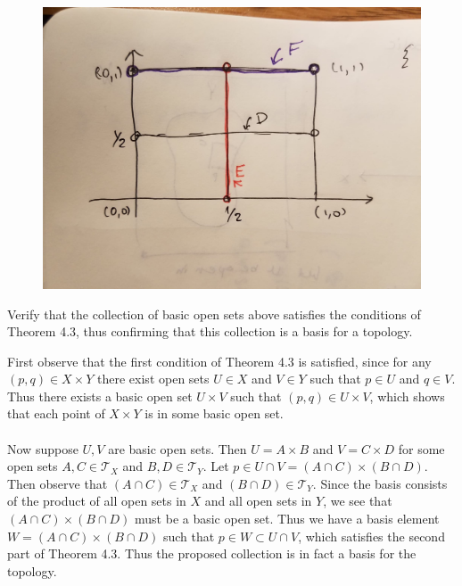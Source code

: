 \documentclass[a4paper,12pt,twoside]{hmcpset}
\begin{document}
\begin{figure}[h!]
    \includegraphics[width = \textwidth]{figures_theorems_sect_4/exercise_4_31.jpg}
\end{figure}

\begin{exercise}[Exercise 4.32]
    Verify that the collection of basic open sets
    above satisfies the conditions of Theorem 4.3, thus confirming that
    this collection is a basis for a topology.
\end{exercise}

\begin{solution}
First observe that the first condition of Theorem 4.3 is satisfied,
since for any $(p, q) \in X \times Y$ there exist open sets $U \in X$
and $V \in Y$ such that $p \in U$ and $q \in V$. Thus there exists a
basic open set $U \times V$ such that $(p, q) \in U \times V$, which
shows that each point of $X \times Y$ is in some basic open set. \\
\\
Now suppose $U, V$ are basic open sets. Then $U = A \times B$ and $V =
C \times D$ for some open sets $A, C \in \mathscr{T}_X$ and $B, D \in
\mathscr{T}_Y$. Let $p \in U \cap V = (A \cap C) \times (B \cap D)$.
Then observe that $(A \cap C) \in \mathscr{T}_X$ and $(B \cap D) \in
\mathscr{T}_Y$. Since the basis consists of the product of all open
sets in $X$ and all open sets in $Y$, we see that $(A \cap C) \times
(B \cap D)$ must be a basic open set. Thus we have a basis element $W
= (A \cap C) \times (B \cap D)$
such that $p \in W \subset U \cap V$, which satisfies the second part
of Theorem 4.3. Thus the proposed collection is in fact a basis for
the topology.
\end{solution}
\end{document}
